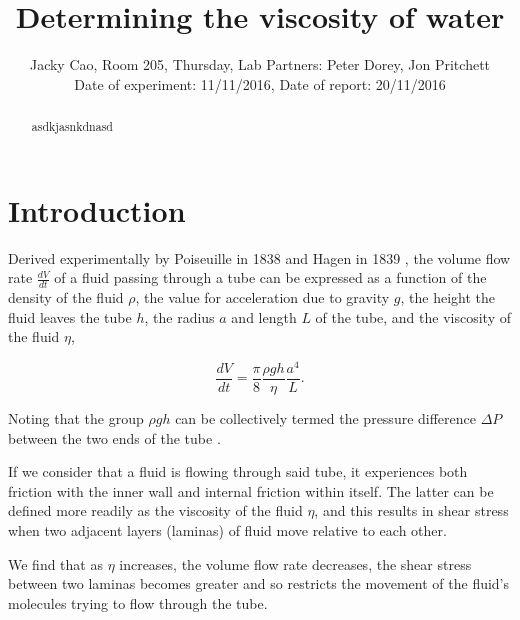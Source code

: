 \documentclass[twocolumn]{revtex4}
\begin{document}
\textheight=26.385cm

\title{Determining the viscosity of water} 
 
 
\author{Jacky Cao, Room 205, Thursday, Lab Partners: Peter Dorey, Jon Pritchett \\ Date of experiment: 11/11/2016, Date of report: 20/11/2016}


\begin{abstract}              
 
asdkjasnkdnasd

\end{abstract}

\maketitle

\section{Introduction} 
\vspace{-2ex} 

Derived experimentally by Poiseuille in 1838 and Hagen in 1839 \cite{poiseuillehagen}, the volume flow rate $\frac{dV}{dt}$ of a fluid passing through a tube can be expressed as a function of the density of the fluid $\rho$, the value for acceleration due to gravity $g$, the height the fluid leaves the tube $h$, the radius $a$ and length $L$ of the tube, and the viscosity of the fluid $\eta$,

\begin{equation} 
\frac{dV}{dt}=\frac{\pi}{8}\frac{\rho gh}{\eta}\frac{a^4}{L}. 
\label{pohagen}
\end{equation}

Noting that the group $\rho gh$ can be collectively termed the pressure difference $\Delta P$ between the two ends of the tube \cite{collegephysics}.

If we consider that a fluid is flowing through said tube, it experiences both friction with the inner wall and internal friction within itself. The latter can be defined more readily as the viscosity of the fluid $\eta$, and this results in shear stress when two adjacent layers (laminas) of fluid move relative to each other. 

We find that as $\eta$ increases, the volume flow rate decreases, the shear stress between two laminas becomes greater and so restricts the movement of the fluid's molecules trying to flow through the tube. 
\end{document}
